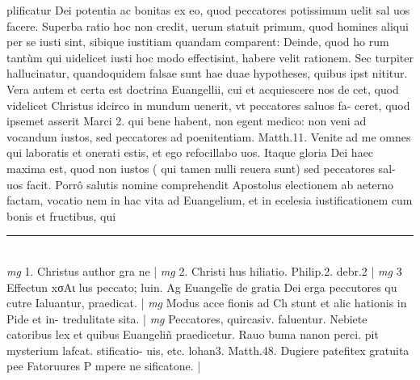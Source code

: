 \documentclass{article}
\begin{document}
\begin{pages}
plificatur Dei potentia ac bonitas ex eo, quod peccatores potissimum uelit sal uos facere. Superba ratio hoc non credit, uerum statuit primum, quod homines aliqui per se iusti sint, sibique iustitiam quandam comparent: Deinde, quod ho rum tantùm qui uidelicet iusti hoc modo effectisint, habere velit rationem. Sec turpiter hallucinatur, quandoquidem falsae sunt hae duae hypotheses, quibus ipst nititur. Vera autem et certa est doctrina Euangellii, cui et acquiescere nos de cet, quod videlicet Christus idcirco in mundum uenerit, vt peccatores saluos fa- ceret, quod ipsemet asserit Marci 2. qui bene habent, non egent medico: non veni ad vocandum iustos, sed peccatores ad poenitentiam. Matth.11. Venite ad me omnes qui laboratis et onerati estis, et ego refocillabo uos. Itaque gloria Dei haec maxima est, quod non iustos ( qui tamen nulli reuera sunt) sed peccatores sal- uos facit.  \pend\pstart Porrô salutis nomine comprehendit Apostolus electionem ab aeterno factam, vocatio nem in hac vita ad Euangelium, et in ecelesia iustificationem cum bonis et fructibus, qui  \pend
\vspace{0.5cm}\noindent
\vspace{0.2cm}\rule{1cm}{0.2pt}\\ 
\hspace{0.2cm}\textit{mg}
\footnotesize 1. Christus author gra ne 
\normalsize| 
\hspace{0.2cm}\textit{mg}
\footnotesize 2. Christi hus hiliatio. Philip.2. debr.2 
\normalsize| 
\hspace{0.2cm}\textit{mg}
\footnotesize 3 Effectun xσAι lus peccato; luin. Ag Euangelĩe de gratia Dei erga peccutores qu cutre Ialuantur, praedicat. 
\normalsize| 
\hspace{0.2cm}\textit{mg}
\footnotesize Modus acce fionis ad Ch stunt et alic hationis in Pide et in- tredulitate sita. 
\normalsize| 
\hspace{0.2cm}\textit{mg}
\footnotesize Peccatores, quircasiv. faluentur. Nebiete catoribus lex et quibus Euangeliñ praedicetur. Rauo buma nanon perci. pit mysterium lafcat. stificatio- uis, etc. lohan3. Matth.48. Dugiere patefitex gratuita pee Fatoruures P mpere ne sificatone. 
\normalsize| 

\end{pages}
\end{document}
